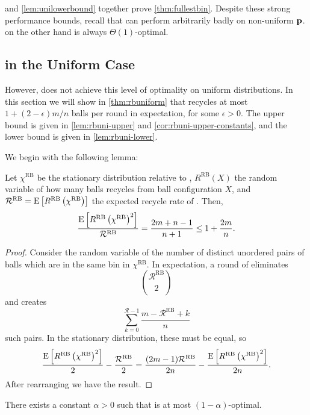  and \cref{lem:unilowerbound}
together prove \cref{thm:fullestbin}.  Despite these strong
performance bounds, recall that \FB can perform arbitrarily badly on
non-uniform $\mathbf{p}$. \RB on the other hand is always $\Theta(1)$-optimal.

\subsection{\RB in the Uniform Case}

However, \RB{} does not achieve this level of optimality on uniform
distributions. In this section we will show in \cref{thm:rbuniform} that \RB
recycles at most $1+(2-\epsilon)m/n$ balls per round in expectation, for some
$\epsilon > 0$.  The upper bound is given in \cref{lem:rbuni-upper} and
\cref{cor:rbuni-upper-constants}, and the lower bound is given in
\cref{lem:rbuni-lower}.

We begin with the following lemma:

\begin{lemma}\label{lem:pair-flow}
	Let $\chi^\textrm{RB}$ be the stationary distribution relative to \RB,
	$R^\textrm{RB}(X)$ the random variable of how many balls \RB recycles from
	ball configuration $X$, and $\mathcal{R}^\textrm{RB} =
	\mathrm{E}\left[R^\textrm{RB}\left(\chi^\textrm{RB}\right)\right]$ the expected recycle rate
	of \RB. Then,
	\[ \frac{\mathrm{E}\left[R^\textrm{RB}\left(\chi^\textrm{RB}\right)^2\right]}{\mathcal{R}^\textrm{RB}} = \frac{2m+n-1}{n+1} \leq 1 + \frac{2m}{n}. \]
\end{lemma}

\begin{proof}
	Consider the random variable of the number of distinct unordered pairs of
	balls which are in the same bin in $\chi^\textrm{RB}$. In expectation, a
	round of \RB eliminates 
	\[\binom{\mathcal{R}^\textrm{RB}}{2}\]
	and creates
	\[\sum_{k=0}^{\mathcal{R} - 1} \frac{m - \mathcal{R}^\textrm{RB} + k}{n}\]
	such pairs. In the stationary distribution, these must be equal, so
        \[ \frac{\mathrm{E}\left[R^\textrm{RB}\left(\chi^\textrm{RB}\right)^2\right]}{2} - \frac{\mathcal{R}^\textrm{RB}}{2} = \frac{(2m-1)\mathcal{R}^\textrm{RB}}{2n} - \frac{\mathrm{E}\left[R^\textrm{RB}\left(\chi^\textrm{RB}\right)^2\right]}{2n}.\]
	After rearranging we have the result.
\end{proof}

\begin{lemma}\label{lem:rbuni-upper}
	There exists a constant $\alpha > 0$ such that \RB is at most
	$(1-\alpha)$-optimal.
\end{lemma}

